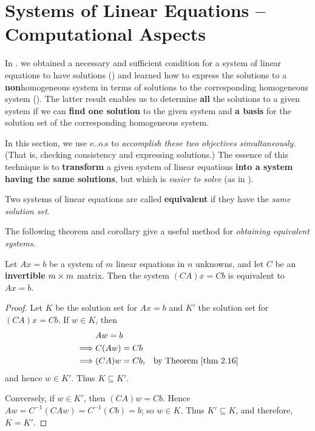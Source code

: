 \section{Systems of Linear Equations -- Computational Aspects} \label{sec 3.4}

In . we obtained a necessary and sufficient condition for a system of linear equations to have solutions () and learned how to express the solutions to a \textbf{non}homogeneous system in terms of solutions to the corresponding homogeneous system ().
The latter result enables us to determine \textbf{all} the solutions to a given system if we can \textbf{find one solution} to the given system and \textbf{a basis} for the solution set of the corresponding homogeneous system.

In this section, we use e..o.s to \emph{accomplish these two objectives simultaneously}.
(That is, checking consistency and expressing solutions.)
The essence of this technique is to \textbf{transform} a given system of linear equations \textbf{into a system having the same solutions}, but which is \emph{easier to solve} (as in ).

\begin{definition} \label{def 3.6}
Two systems of linear equations are called \textbf{equivalent} if they have the \emph{same solution set}.
\end{definition}

The following theorem and corollary give a useful method for \emph{obtaining equivalent systems}.

\begin{theorem} \label{thm 3.13}
Let \(Ax = b\) be a system of \(m\) linear equations in \(n\) unknowns, and let \(C\) be an \textbf{invertible} \(m \times m\) matrix.
Then the system \((CA)x = Cb\) is equivalent to \(Ax = b\).
\end{theorem}

\begin{proof}
Let \(K\) be the solution set for \(Ax = b\) and \(K'\) the solution set for \((CA)x = Cb\).
If \(w \in K\), then
\begin{align*}
             & Aw = b \\
    \implies & C(Aw) = Cb \\
    \implies & (CA)w = Cb, & \text{by \THM{2.16}}
\end{align*}
and hence \(w \in K'\).
Thus \(K \subseteq K'\).

Conversely, if \(w \in K'\), then \((CA)w = Cb\).
Hence \(Aw = C^{-1}(CAw) = C^{-1}(Cb) = b\);
so \(w \in K\).
Thus \(K' \subseteq K\), and therefore, \(K = K'\).
\end{proof}

